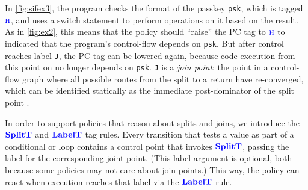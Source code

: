 \documentclass{llncs}
\begin{document}
In \cref{fig:sifex3}, the program checks the format of the passkey {\tt psk}, which is tagged
\(\textnormal{\color{blue} \sc h}\), and uses a switch statement to perform operations on it based on the result.
As in \cref{fig:ex2}, this means that the policy should ``raise'' the PC tag to \(\textnormal{\color{blue} \sc h}\) to
indicated that the program's control-flow depends on {\tt psk}.
But after control reaches label {\tt J}, the PC tag can be lowered again, because code execution from this
point on no longer depends on {\tt psk}.
{\tt J} is a {\em join point}: the point in a control-flow graph where all
possible routes from the split to a return have re-converged, which can be identified
statically as the immediate post-dominator of the split point \cite{Denning77:SecureInformationFlow}.

In order to support policies that reason about splits and joins, we introduce the \(\color{blue} \mathbf{SplitT}\) and
\(\color{blue} \mathbf{LabelT}\) tag rules. Every transition that tests a value as part of a conditional or loop
contains a control point that invokes \(\color{blue} \mathbf{SplitT}\), passing the label for the corresponding joint point.
(This label argument is optional, both because some policies may not care
about join points.) 
This way, the policy can react when execution reaches that label via the \(\color{blue} \mathbf{LabelT}\) rule.
\end{document}
